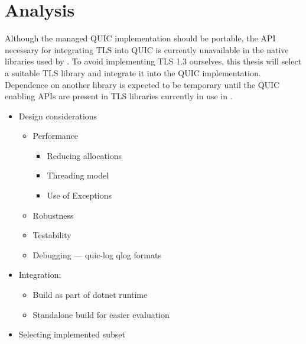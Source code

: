 \chapter{Analysis}\label{chap:03-analysis}


Although the managed QUIC implementation should be portable, the API necessary for integrating TLS
into QUIC is currently unavailable in the native libraries used by \dotnet{}. To avoid implementing
TLS 1.3 ourselves, this thesis will select a suitable TLS library and integrate it into the QUIC
implementation. Dependence on another library is expected to be temporary until the QUIC enabling
APIs are present in TLS libraries currently in use in \dotnet{}.

\begin{itemize}

    \item Design considerations
    \begin{itemize}

        \item Performance
        \begin{itemize}

            \item Reducing allocations
            \item Threading model
            \item Use of Exceptions

        \end{itemize}

        \item Robustness

        \item Testability

        \item Debugging --- quic-log qlog formats

    \end{itemize}

    \item Integration:
    \begin{itemize}

        \item Build as part of dotnet runtime
        \item Standalone build for easier evaluation

    \end{itemize}

    \item Selecting implemented subset
    \begin{itemize}


\end{itemize}
\end{itemize}
